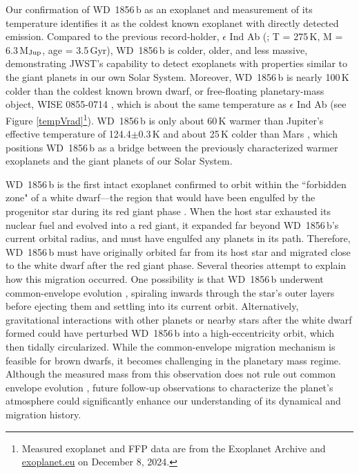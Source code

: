 \documentclass[twocolumn]{aastex631}
\begin{document}
Our confirmation of WD~1856\,b as an exoplanet and measurement of its temperature identifies it as the coldest known exoplanet with directly detected emission. Compared to the previous record-holder, $\epsilon$ Ind Ab (\citealt{2024Natur.633..789M}; T = 275\,K, M = 6.3\,M$_{\rm Jup}$, age = 3.5\,Gyr), WD~1856\,b is colder, older, and less massive, demonstrating JWST's capability to detect exoplanets with properties similar to the giant planets in our own Solar System. Moreover, WD~1856\,b is nearly 100\,K colder than the coldest known brown dwarf, or free-floating planetary-mass object, WISE 0855-0714 \citep{2024AJ....167....5L}, which is about the same temperature as $\epsilon$ Ind Ab (see Figure \ref{tempVrad}\footnote{Measured exoplanet and FFP data are from the Exoplanet Archive and \url{exoplanet.eu} on December 8, 2024.}). WD~1856\,b is only about 60\,K warmer than Jupiter's effective temperature of 124.4$\pm$0.3\,K \citep{2023RemS...15.1811R} and about 25\,K colder than Mars \citep{HaberleBook}, which positions WD~1856\,b as a bridge between the previously characterized warmer exoplanets and the giant planets of our Solar System. 


WD~1856\,b is the first intact exoplanet confirmed to orbit within the ``forbidden zone" of a white dwarf—the region that would have been engulfed by the progenitor star during its red giant phase \citep{2013MNRAS.432..500N}. When the host star exhausted its nuclear fuel and evolved into a red giant, it expanded far beyond WD~1856\,b's current orbital radius, and must have engulfed any planets in its path. Therefore, WD~1856\,b must have originally orbited far from its host star and migrated close to the white dwarf after the red giant phase. %
Several theories attempt to explain how this migration occurred. One possibility is that WD~1856\,b underwent common-envelope evolution \citep{2021MNRAS.501..676L,2021MNRAS.502L.110C}, spiraling inwards through the star's outer layers before ejecting them and settling into its current orbit. Alternatively, gravitational interactions with other planets \citep{2021MNRAS.501L..43M} or nearby stars \citep{2020ApJ...904L...3M,2021MNRAS.501..507O,2021ApJ...922....4S} after the white dwarf formed could have perturbed WD~1856\,b into a high-eccentricity orbit, which then tidally circularized.
While the common-envelope migration mechanism is feasible for brown dwarfs, it becomes challenging in the planetary mass regime. Although the measured mass from this observation does not rule out common envelope evolution \citep{2021MNRAS.501..676L}, future follow-up observations to characterize the planet's atmosphere could significantly enhance our understanding of its dynamical and migration history.
\end{document}
